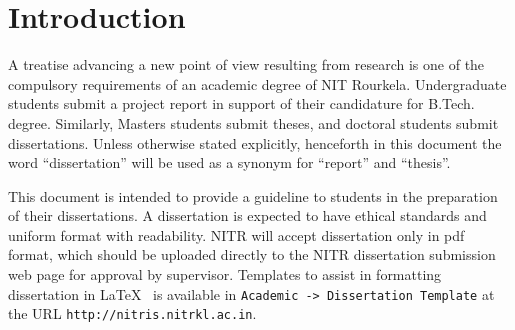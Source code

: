 \chapter{Introduction}\label{Guidelines}
A treatise advancing a new point of view resulting from research is one of the compulsory requirements of an academic degree of NIT Rourkela. Undergraduate students submit a project report in support of their candidature for B.Tech. degree. Similarly, Masters students submit theses, and doctoral students submit dissertations. Unless otherwise stated explicitly, henceforth in this document the word ``dissertation'' will be used as a synonym for ``report'' and ``thesis''. 
\par This document is intended to provide a guideline to students in the preparation of their dissertations. A dissertation is expected to have ethical standards and uniform format with readability. NITR will accept dissertation only in pdf format, which should be uploaded directly to the NITR dissertation submission web page for approval by supervisor. Templates to assist in formatting dissertation in \LaTeX~ is available in \texttt{Academic -> Dissertation Template} at the URL \texttt{http://nitris.nitrkl.ac.in}.
